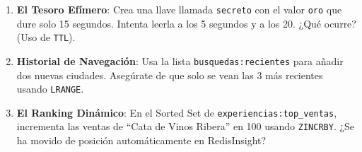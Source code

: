 \documentclass[12pt,a4paper]{article}
\begin{document}
\begin{enumerate}
    \item \textbf{El Tesoro Efímero}: Crea una llave llamada \texttt{secreto} con el valor \texttt{oro} que dure solo 15 segundos. Intenta leerla a los 5 segundos y a los 20. ¿Qué ocurre? (Uso de \texttt{TTL}).
    \item \textbf{Historial de Navegación}: Usa la lista \texttt{busquedas:recientes} para añadir dos nuevas ciudades. Asegúrate de que solo se vean las 3 más recientes usando \texttt{LRANGE}.
    \item \textbf{El Ranking Dinámico}: En el Sorted Set de \texttt{experiencias:top\_ventas}, incrementa las ventas de \enquote{Cata de Vinos Ribera} en 100 usando \texttt{ZINCRBY}. ¿Se ha movido de posición automáticamente en RedisInsight?
\end{enumerate}
\end{document}
